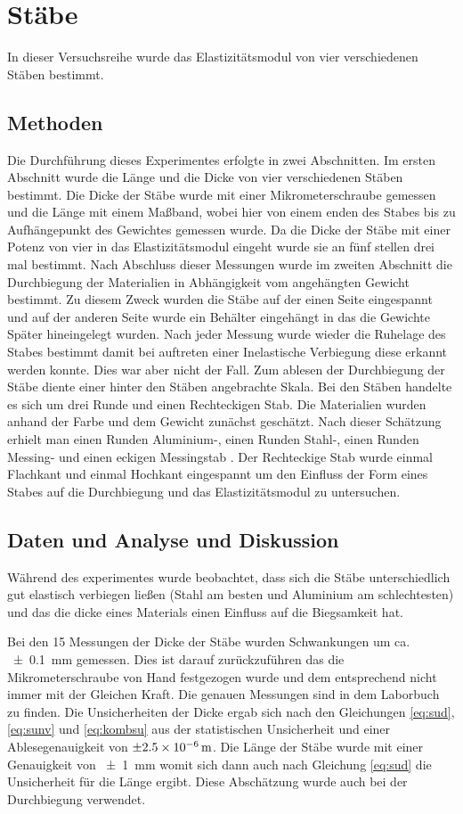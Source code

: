 \section{Stäbe}
In dieser Versuchsreihe wurde das Elastizitätsmodul von vier verschiedenen Stäben bestimmt.
\subsection{Methoden}
Die Durchführung dieses Experimentes erfolgte in zwei Abschnitten.
Im ersten Abschnitt wurde die Länge und die Dicke von vier verschiedenen Stäben bestimmt.
Die Dicke der Stäbe wurde mit einer Mikrometerschraube gemessen und die Länge mit einem Maßband, wobei hier von einem enden des Stabes bis zu Aufhängepunkt des Gewichtes gemessen wurde.
Da die Dicke der Stäbe mit einer Potenz von vier in das Elastizitätsmodul eingeht wurde sie an fünf stellen drei mal bestimmt.  Nach Abschluss dieser Messungen wurde im zweiten Abschnitt die Durchbiegung der Materialien in Abhängigkeit vom angehängten Gewicht bestimmt. Zu diesem Zweck wurden die Stäbe auf der einen Seite eingespannt und auf der anderen Seite wurde ein Behälter eingehängt in das die Gewichte Später hineingelegt wurden.
Nach jeder Messung wurde wieder die Ruhelage des Stabes bestimmt damit bei auftreten einer Inelastische Verbiegung diese erkannt werden konnte. Dies war aber nicht der Fall. Zum ablesen der Durchbiegung der Stäbe diente einer hinter den Stäben angebrachte Skala.
Bei den Stäben handelte es sich um drei Runde und einen Rechteckigen Stab. Die Materialien wurden anhand der Farbe und dem Gewicht zunächst geschätzt.
Nach dieser Schätzung erhielt man einen Runden Aluminium-, einen Runden Stahl-, einen Runden Messing- und einen eckigen Messingstab . Der Rechteckige Stab wurde einmal Flachkant und einmal Hochkant eingespannt um den Einfluss der Form eines Stabes auf die Durchbiegung und das Elastizitätsmodul zu untersuchen.

\subsection{Daten und Analyse und Diskussion}
Während des experimentes wurde beobachtet, dass sich die Stäbe unterschiedlich gut elastisch verbiegen ließen (Stahl am besten und Aluminium am schlechtesten) und das die dicke eines Materials 
einen Einfluss auf die Biegsamkeit hat.

Bei  den 15 Messungen der Dicke der Stäbe wurden Schwankungen um ca. \SI{+-0,1}{mm} gemessen. Dies ist darauf zurückzuführen das die Mikrometerschraube von Hand festgezogen wurde und dem entsprechend nicht immer mit der Gleichen Kraft.
Die genauen Messungen sind in dem Laborbuch zu finden. Die Unsicherheiten der Dicke ergab sich nach den Gleichungen \ref{eq:sud}, \ref{eq:sunv} und \ref{eq:kombsu} aus der statistischen Unsicherheit und einer Ablesegenauigkeit von $\SI{\pm 2.5e-6}{m}$.   
Die Länge der Stäbe wurde mit einer Genauigkeit von \SI{+-1}{mm} womit sich dann auch nach Gleichung \ref{eq:sud} die Unsicherheit für die Länge ergibt. Diese Abschätzung wurde auch bei der Durchbiegung verwendet.

